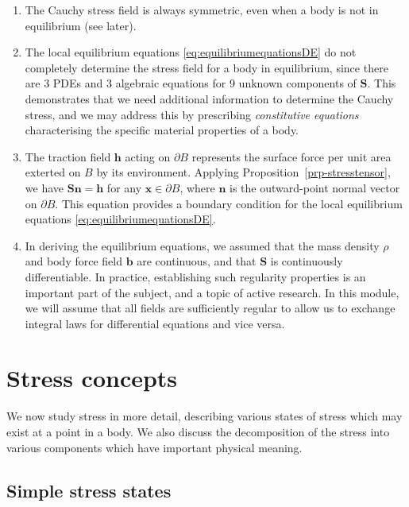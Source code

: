 \documentclass[
  letterpaper,
  DIV=11,
  numbers=noendperiod]{scrreprt}
\theoremstyle{plain}
\theoremstyle{remark}
\begin{document}
\begin{enumerate}
\def\labelenumi{\arabic{enumi}.}
\item
  The Cauchy stress field is always symmetric, even when a body is not
  in equilibrium (see later).
\item
  The local equilibrium equations
  \hyperref[eq:equilibriumequationsDE]{{[}eq:equilibriumequationsDE{]}}
  do not completely determine the stress field for a body in
  equilibrium, since there are 3 PDEs and 3 algebraic equations for 9
  unknown components of \({\boldsymbol{S}}\). This demonstrates that we
  need additional information to determine the Cauchy stress, and we may
  address this by prescribing \emph{constitutive equations}
  characterising the specific material properties of a body.
\item
  The traction field \({\boldsymbol{h}}\) acting on \(\partial B\)
  represents the surface force per unit area exterted on \(B\) by its
  environment. Applying Proposition~\ref{prp-stresstensor}, we have
  \({\boldsymbol{S}}{\boldsymbol{n}}={\boldsymbol{h}}\) for any
  \({\boldsymbol{x}}\in\partial B\), where \({\boldsymbol{n}}\) is the
  outward-point normal vector on \(\partial B\). This equation provides
  a boundary condition for the local equilibrium equations
  \hyperref[eq:equilibriumequationsDE]{{[}eq:equilibriumequationsDE{]}}.
\item
  In deriving the equilibrium equations, we assumed that the mass
  density \(\rho\) and body force field \({\boldsymbol{b}}\) are
  continuous, and that \({\boldsymbol{S}}\) is continuously
  differentiable. In practice, establishing such regularity properties
  is an important part of the subject, and a topic of active research.
  In this module, we will assume that all fields are sufficiently
  regular to allow us to exchange integral laws for differential
  equations and vice versa.
\end{enumerate}

\section{Stress concepts}\label{stress-concepts}

We now study stress in more detail, describing various states of stress
which may exist at a point in a body. We also discuss the decomposition
of the stress into various components which have important physical
meaning.

\subsection{Simple stress states}\label{simple-stress-states}
\end{document}
